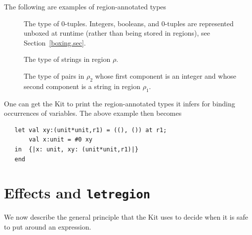 \documentclass[12pt]{book}
\begin{document}
The following are examples of region-annotated types
\begin{description}
\item[] The type of 0-tuples.  Integers,
  booleans, and 0-tuples are represented unboxed at
  runtime (rather than being stored in regions), see
  Section~\ref{boxing.sec}.
\item[] The type of strings in region
  $\rho$.
\item[] The type of pairs in $\rho_2$ whose first
  component is an integer and whose second component is a string in
  region $\rho_1$.
\end{description}


One can get the Kit to print the region-annotated types it infers
for binding occurrences of variables. 
The above example then becomes
\begin{verbatim}
   let val xy:(unit*unit,r1) = ((), ()) at r1; 
       val x:unit = #0 xy
   in  {|x: unit, xy: (unit*unit,r1)|}
   end 
\end{verbatim}

\section{Effects and {\tt letregion}}
\label{effects.sec}
We now describe the general principle that the Kit uses to decide
when it is safe to put  around  an expression.
\end{document}
